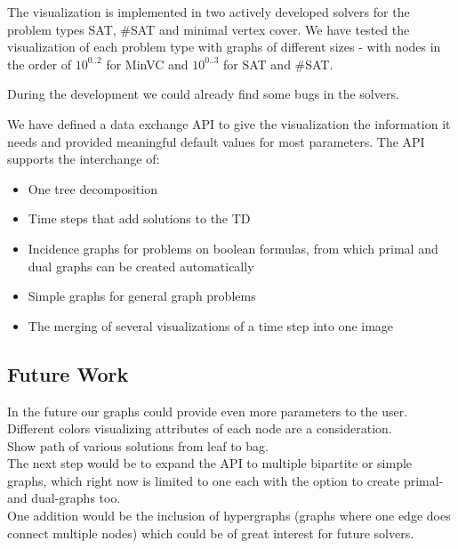 \documentclass[a4paper, 12pt, bibliography=totoc]{scrartcl}
\begin{document}
The visualization is implemented in two actively developed solvers for the problem types {SAT}, {\#SAT} and {minimal vertex cover}. We have tested the visualization of each problem type with graphs of different sizes - with nodes in the order of $10^{0..2}$ for MinVC and $10^{0..3}$ for SAT and \#SAT.

During the development we could already find some bugs in the solvers.

We have defined a data exchange API to give the visualization the information it needs and provided meaningful default values for most parameters. The API supports the interchange of:
\begin{itemize}
	\item One tree decomposition
	\item Time steps that add solutions to the TD
	\item Incidence graphs for problems on boolean formulas, from which primal and dual graphs can be created automatically
	\item Simple graphs for general graph problems
	\item The merging of several visualizations of a time step into one image
\end{itemize}


\subsection{Future Work}
In the future our graphs could provide even more parameters to the user. \\

Different colors visualizing attributes of each node are a consideration.\\

Show path of various solutions from leaf to bag. \\

The next step would be to expand the API to multiple bipartite or simple graphs, which right now is limited to one each with the option to create primal- and dual-graphs too.\\

One addition would be the inclusion of hypergraphs (graphs where one edge does connect multiple nodes) which could be of great interest for future solvers.\\
\end{document}
